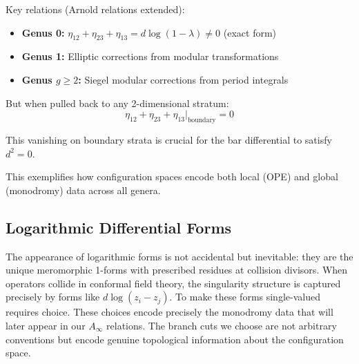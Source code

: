 \begin{example}
Key relations (Arnold relations extended):
\begin{itemize}
\item \textbf{Genus 0:} $\eta_{12} + \eta_{23} + \eta_{13} = d\log(1-\lambda) \neq 0$ (exact form)
\item \textbf{Genus 1:} Elliptic corrections from modular transformations
\item \textbf{Genus $g \geq 2$:} Siegel modular corrections from period integrals
\end{itemize}

But when pulled back to any 2-dimensional stratum:
$$\eta_{12} + \eta_{23} + \eta_{13}|_{\text{boundary}} = 0$$

This vanishing on boundary strata is crucial for the bar differential to satisfy $d^2 = 0$.

This exemplifies how configuration spaces encode both local (OPE) and global (monodromy) data across all genera.
\end{example}
 
\subsection{Logarithmic Differential Forms}

\begin{remark}
The appearance of logarithmic forms is not accidental but inevitable: they are the unique meromorphic 1-forms with prescribed residues at collision divisors. When operators collide in conformal field theory, the singularity structure is captured precisely by forms like $d\log(z_i - z_j)$. To make these forms single-valued requires choice. These choices encode precisely the monodromy data that will later appear in our $A_\infty$ relations. The branch cuts we choose are not arbitrary conventions but encode genuine topological information about the configuration space.
\end{remark}


